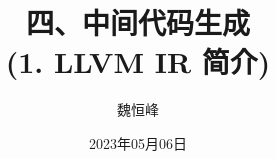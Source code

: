 \documentclass[handout]{beamer}
\title[中间代码生成]{四、中间代码生成 \\ (1. LLVM IR 简介)}
\author[魏恒峰]{\large 魏恒峰}
\institute{hfwei@nju.edu.cn}
\date{2023年05月06日}
\begin{document}
\maketitle




\thankyou{}

\end{document}
